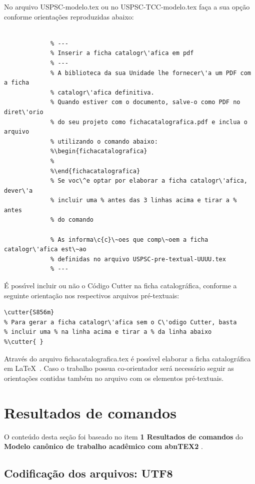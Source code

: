No arquivo USPSC-modelo.tex ou no USPSC-TCC-modelo.tex fa\c{c}a a sua op\c{c}\~ao conforme orienta\c{c}\~oes reproduzidas abaixo:

			 \begin{verbatim}
			 
			 % ---
			 % Inserir a ficha catalogr\'afica em pdf
			 % ---
			 % A biblioteca da sua Unidade lhe fornecer\'a um PDF com a ficha
			 % catalogr\'afica definitiva. 
			 % Quando estiver com o documento, salve-o como PDF no diret\'orio
			 % do seu projeto como fichacatalografica.pdf e inclua o arquivo
			 % utilizando o comando abaixo:
			 %\begin{fichacatalografica}
			 %   
			 %\end{fichacatalografica}
			 % Se voc\^e optar por elaborar a ficha catalogr\'afica, dever\'a 
			 % incluir uma % antes das 3 linhas acima e tirar a % antes
			 % do comando 
			 
			 % As informa\c{c}\~oes que comp\~oem a ficha catalogr\'afica est\~ao 
			 % definidas no arquivo USPSC-pre-textual-UUUU.tex
			 % ---
			 \end{verbatim} 
			 				
\'E poss\'{\i}vel incluir ou n\~ao o C\'odigo Cutter na ficha catalogr\'afica, conforme a seguinte orienta\c{c}\~ao nos respectivos arquivos pr\'e-textuais:

\begin{verbatim}
\cutter{S856m}
% Para gerar a ficha catalogr\'afica sem o C\'odigo Cutter, basta 
% incluir uma % na linha acima e tirar a % da linha abaixo
%\cutter{ } 
\end{verbatim} 

Atrav\'es do arquivo fichacatalografica.tex \'e poss\'{\i}vel elaborar a ficha catalogr\'afica em \LaTeX\ . Caso o trabalho possua co-orientador ser\'a necess\'ario seguir as orienta\c{c}\~oes contidas tamb\'em no arquivo com os elementos pr\'e-textuais.	 


\section{Resultados de comandos}\label{sec-divisoes}

O conte\'udo desta se\c{c}\~ao foi baseado no item \textbf{1 Resultados de comandos} do \textbf{Modelo can\^onico de trabalho acad\^emico com abnTEX2} \cite{equipeabntex2}.

\subsection{Codifica\c{c}\~ao dos arquivos: UTF8}

